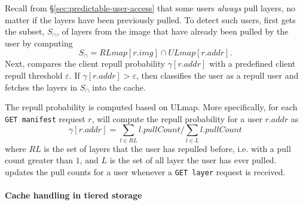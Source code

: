 Recall from \S\ref{sec:predictable-user-access} that some users \emph{always} pull
layers, no matter if the layers have been previously pulled. To detect such users,
\sysname first gets the subset, $S_{\cap}$, of layers from the image that have already
been pulled by the user by computing
%
\begin{equation*}
S_{\cap} = RLmap[r.img] \cap ULmap[r.addr].
\end{equation*}
%
Next,  \sysname compares the client repull probability 
$\gamma[r.addr]$ with a predefined client repull threshold $\varepsilon$.
If $\gamma[r.addr] > \varepsilon$, then \sysname classifies the user as a repull user
and fetches the layers in $S_{\cap}$ into the cache.
%

The repull probability is computed based on ULmap. More specifically, for each
\texttt{GET manifest} request $r$, \sysname will compute the repull probability for a user
$r.addr$ as
\begin{equation*}
\gamma[r.addr] = \sum_{l \in RL} l.pullCount /  \sum_{l \in L} l.pullCount
\end{equation*}
where $RL$ is the set of layers that the user has repulled before, i.e. with a pull count greater
than $1$, and $L$ is the set of all layer the user has ever pulled. \sysname updates the pull
counts for a user whenever a \texttt{GET layer} request is received.
%

\paragraph{Cache handling in tiered storage} 

